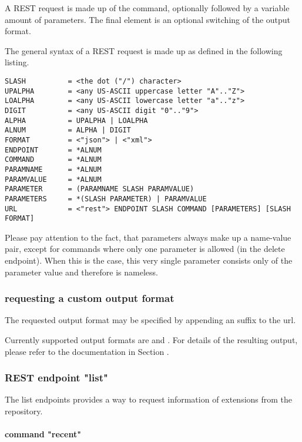 A REST request is made up of the command, optionally followed by a variable amount of parameters. The final element is an optional switching of the output format.

The general syntax of a REST request is made up as defined in the following listing.
\begin{lstlisting}[caption=REST API URL in EBNF]
SLASH          = <the dot ("/") character>
UPALPHA        = <any US-ASCII uppercase letter "A".."Z">
LOALPHA        = <any US-ASCII lowercase letter "a".."z">
DIGIT          = <any US-ASCII digit "0".."9">
ALPHA          = UPALPHA | LOALPHA
ALNUM          = ALPHA | DIGIT
FORMAT         = <"json"> | <"xml">
ENDPOINT       = *ALNUM
COMMAND        = *ALNUM
PARAMNAME      = *ALNUM
PARAMVALUE     = *ALNUM
PARAMETER      = (PARAMNAME SLASH PARAMVALUE)
PARAMETERS     = *(SLASH PARAMETER) | PARAMVALUE
URL            = <"rest"> ENDPOINT SLASH COMMAND [PARAMETERS] [SLASH FORMAT]
\end{lstlisting}

Please pay attention to the fact, that parameters always make up a name-value pair, except for commands where only one parameter is allowed (\ie in the delete endpoint). When this is the case, this very single parameter consists only of the parameter value and therefore is nameless.

\subsubsection[sec:repository rest api output format]{requesting a custom output format}

The requested output format may be specified by appending an suffix to the url.

Currently supported output formats are  and . For details of the resulting output, please refer to the documentation in Section .

\subsubsection[sec:repository rest api endpoint list]{REST endpoint "list"}

The list endpoints provides a way to request information of extensions from the repository.

\paragraph{command "recent"}

